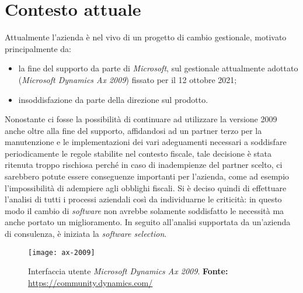 \section{Contesto attuale}

Attualmente l'azienda è nel vivo di un progetto di cambio gestionale, motivato principalmente da:
\begin{itemize}
	\item la fine del supporto da parte di \textit{Microsoft}, sul gestionale attualmente adottato (\textit{Microsoft Dynamics Ax 2009}) fissato per il 12 ottobre 2021;
	\item insoddisfazione da parte della direzione sul prodotto.
\end{itemize}
Nonostante ci fosse la possibilità di continuare ad utilizzare la versione 2009 anche oltre alla fine del supporto, affidandosi ad un partner terzo per la manutenzione e le implementazioni dei vari adeguamenti necessari a soddisfare periodicamente le regole stabilite nel contesto fiscale, tale decisione è stata ritenuta troppo rischiosa perché in caso di inadempienze del partner scelto, ci sarebbero potute essere conseguenze importanti per l'azienda, come ad esempio l'impossibilità di adempiere agli obblighi fiscali.
Si è deciso quindi di effettuare l'analisi di tutti i processi aziendali così da individuarne le criticità: in questo modo il cambio di \textit{software} non avrebbe solamente soddisfatto le necessità ma anche portato un miglioramento. In seguito all'analisi supportata da un'azienda di consulenza, è iniziata la \textit{software selection}.

\vspace{10pt}
\begin{figure}[htbp]
	\begin{center}
		\texttt{[image: ax-2009]}
		\caption{Interfaccia utente \textit{Microsoft Dynamics Ax 2009}. \newline \textbf{Fonte: }\url{https://community.dynamics.com/}}
	\end{center}
\end{figure}
\vspace{10pt}

